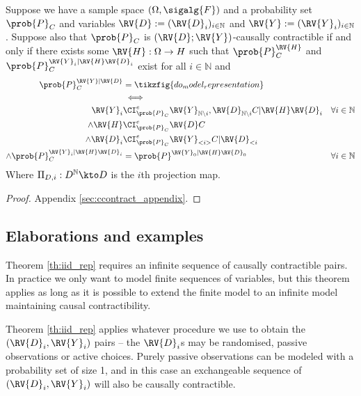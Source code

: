 \begin{theorem}\label{th:iid_rep}
Suppose we have a sample space $(\Omega,\sigalg{F})$ and a probability set $\prob{P}_C$ and variables $\RV{D}:=(\RV{D}_i)_{i\in \mathbb{N}}$ and $\RV{Y}:=(\RV{Y}_i)_{i\in \mathbb{N}}$. Suppose also that  $\prob{P}_C$ is $(\RV{D};\RV{Y})$-causally contractible if and only if there exists some $\RV{H}:\Omega\to H$ such that $\prob{P}^{\RV{H}}_C$ and $\prob{P}_C^{\RV{Y}_i|\RV{H}\RV{D}_i}$ exist for all $i\in \mathbb{N}$ and
\begin{align}
    \prob{P}_C^{\RV{Y}|\RV{D}} &= \tikzfig{do_model_representation}\\
    &\iff\\
    \RV{Y}_i&\CI^e_{\prob{P}_C} \RV{Y}_{\mathbb{N}\setminus i},\RV{D}_{\mathbb{N}\setminus i}C|\RV{H}\RV{D}_i&\forall i\in \mathbb{N}\\
    \land \RV{H} &\CI^e_{\prob{P}_C} \RV{D} C\\
    \land \RV{D}_i&\CI_{\prob{P}_C}^e \RV{Y}_{<i>} C|\RV{D}_{<i}\\
    \land \prob{P}_C^{\RV{Y}_i|\RV{H}\RV{D}_i} &= \prob{P}^{\RV{Y}_0|\RV{H}\RV{D}_0} & \forall i\in \mathbb{N}
\end{align}
Where $\Pi_{D,i}:D^\mathbb{N}\kto D$ is the $i$th projection map.
\end{theorem}

\begin{proof}
Appendix \ref{sec:ccontract_appendix}.
\end{proof}

\subsection{Elaborations and examples}

Theorem \ref{th:iid_rep} requires an infinite sequence of causally contractible pairs. In practice we only want to model finite sequences of variables, but this theorem applies as long as it is possible to extend the finite model to an infinite model maintaining causal contractibility.


Theorem \ref{th:iid_rep} applies whatever procedure we use to obtain the $(\RV{D}_i,\RV{Y}_i)$ pairs -- the $\RV{D}_i$s may be randomised, passive observations or active choices. Purely passive observations can be modeled with a probability set of size 1, and in this case an exchangeable sequence of $(\RV{D}_i,\RV{Y}_i)$ will also be causally contractible.

